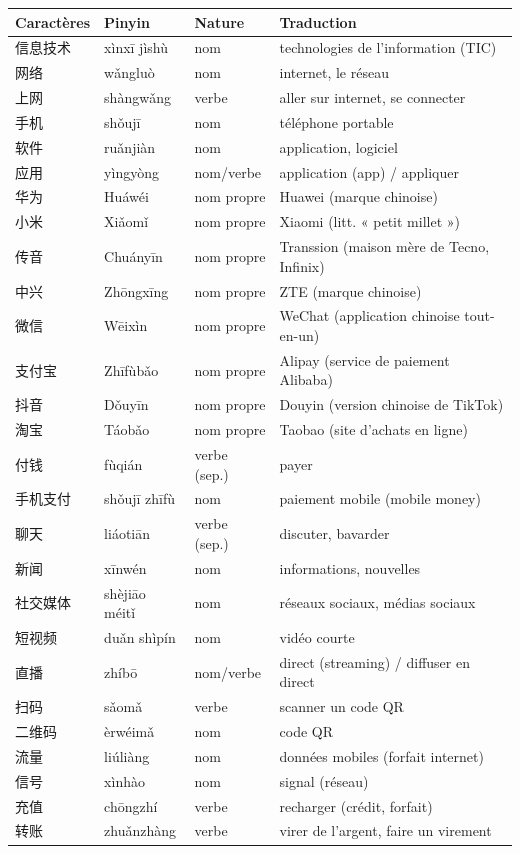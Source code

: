 \documentclass[11pt]{article}
\begin{document}
\begin{center}
\begin{tabularx}{\linewidth}{|X|X|X|X|}
\hline
\rowcolor{popblueL} Caractères & Pinyin & Nature & Traduction \\
\hline
信息技术 & xìnxī jìshù & nom & technologies de l'information (TIC) \\
\hline
网络 & wǎngluò & nom & internet, le réseau \\
\hline
上网 & shàngwǎng & verbe & aller sur internet, se connecter \\
\hline
手机 & shǒujī & nom & téléphone portable \\
\hline
软件 & ruǎnjiàn & nom & application, logiciel \\
\hline
应用 & yìngyòng & nom/verbe & application (app) / appliquer \\
\hline
华为 & Huáwéi & nom propre & Huawei (marque chinoise) \\
\hline
小米 & Xiǎomǐ & nom propre & Xiaomi (litt. « petit millet ») \\
\hline
传音 & Chuányīn & nom propre & Transsion (maison mère de Tecno, Infinix) \\
\hline
中兴 & Zhōngxīng & nom propre & ZTE (marque chinoise) \\
\hline
微信 & Wēixìn & nom propre & WeChat (application chinoise tout-en-un) \\
\hline
支付宝 & Zhīfùbǎo & nom propre & Alipay (service de paiement Alibaba) \\
\hline
抖音 & Dǒuyīn & nom propre & Douyin (version chinoise de TikTok) \\
\hline
淘宝 & Táobǎo & nom propre & Taobao (site d'achats en ligne) \\
\hline
付钱 & fùqián & verbe (sep.) & payer \\
\hline
手机支付 & shǒujī zhīfù & nom & paiement mobile (mobile money) \\
\hline
聊天 & liáotiān & verbe (sep.) & discuter, bavarder \\
\hline
新闻 & xīnwén & nom & informations, nouvelles \\
\hline
社交媒体 & shèjiāo méitǐ & nom & réseaux sociaux, médias sociaux \\
\hline
短视频 & duǎn shìpín & nom & vidéo courte \\
\hline
直播 & zhíbō & nom/verbe & direct (streaming) / diffuser en direct \\
\hline
扫码 & sǎomǎ & verbe & scanner un code QR \\
\hline
二维码 & èrwéimǎ & nom & code QR \\
\hline
流量 & liúliàng & nom & données mobiles (forfait internet) \\
\hline
信号 & xìnhào & nom & signal (réseau) \\
\hline
充值 & chōngzhí & verbe & recharger (crédit, forfait) \\
\hline
转账 & zhuǎnzhàng & verbe & virer de l'argent, faire un virement \\
\hline
\end{tabularx}
\end{center}
\end{document}

